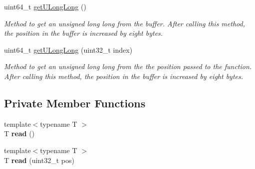\begin{DoxyCompactItemize}
uint64\_\-t \hyperlink{classBuffer_a569f8603324b4db03f4461932f7537cb}{getULongLong} ()
\begin{DoxyCompactList}\small\item\em Method to get an unsigned long long from the buffer. After calling this method, the position in the buffer is increased by eight bytes. \item\end{DoxyCompactList}\item 
uint64\_\-t \hyperlink{classBuffer_af73ab97665bd53f27bd142234b2ee749}{getULongLong} (uint32\_\-t index)
\begin{DoxyCompactList}\small\item\em Method to get an unsigned long long from the the position passed to the function. After calling this method, the position in the buffer is increased by eight bytes. \item\end{DoxyCompactList}\end{DoxyCompactItemize}
\subsection*{Private Member Functions}
\begin{DoxyCompactItemize}
\item 
\hypertarget{classBuffer_a5c61830f4da68ec0052c027ef920efd0}{
{\footnotesize template$<$typename T $>$ }\\T {\bfseries read} ()}
\label{classBuffer_a5c61830f4da68ec0052c027ef920efd0}

\item 
\hypertarget{classBuffer_aff15b0854a1abcb0763abfd910d78fde}{
{\footnotesize template$<$typename T $>$ }\\T {\bfseries read} (uint32\_\-t pos)}
\label{classBuffer_aff15b0854a1abcb0763abfd910d78fde}

\end{DoxyCompactItemize}

